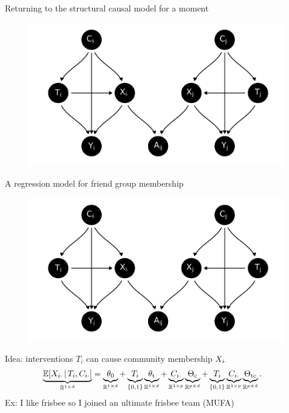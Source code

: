 \documentclass{beamer}
\theoremstyle{remark}
\begin{document}
\begin{frame}{Returning to the structural causal model for a moment}

    \centering

    \begin{figure}
        \includegraphics[scale=0.65]{figures/dags/mediating-5.png}
        \label{fig:mediating-5-again}
    \end{figure}

\end{frame}

\begin{frame}{A regression model for friend group membership}

    \centering

    \begin{figure}
        \includegraphics[scale=0.35]{figures/dags/mediating-5.png}
        \label{fig:mediating-5-again}
    \end{figure}
    Idea: interventions $T_i$ can cause community membership $X_{i \cdot}$
    \begin{align*}
        \underbrace{\E[T_i, \C_{i \cdot}]{\X_{i \cdot}}}_{\R^{1 \times d}}
         & = \underbrace{\thetazero}_{\R^{1 \times d}}
        + \underbrace{T_i}_{\{0, 1\}} \underbrace{\thetat}_{\R^{1 \times d}}
        + \underbrace{\C_{i \cdot}}_{\R^{1 \times p}} \underbrace{\Thetac}_{\R^{p \times d}}
        + \underbrace{T_i}_{\{0, 1\}} \underbrace{\C_{i \cdot}}_{\R^{1 \times p}} \underbrace{\Thetatc}_{\R^{p \times d}}.
    \end{align*}
    Ex: I like frisbee so I joined an ultimate frisbee team (MUFA)

\end{frame}
\end{document}
